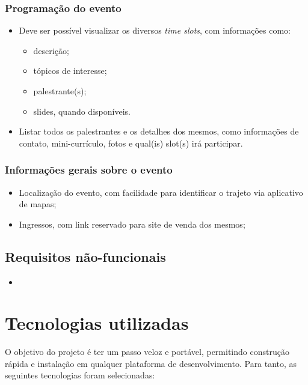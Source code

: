 \documentclass[12pt,a4paper,twoside,hyphens,english,brazil]{abntex2}
\begin{document}
\subsubsection*{Programação do evento}
\begin{itemize}
	\item Deve ser possível visualizar os diversos \emph{time slots}, com informações como:
		\begin{itemize}
			\item descrição;
			\item tópicos de interesse;
			\item palestrante(s);
			\item slides, quando disponíveis.
		\end{itemize}
	\item Listar todos os palestrantes e os detalhes dos mesmos, como informações de contato, mini-currículo, fotos e qual(is) slot(s) irá participar.
\end{itemize}

\subsubsection*{Informações gerais sobre o evento}
\begin{itemize}
	\item Localização do evento, com facilidade para identificar o trajeto via aplicativo de mapas;
	\item Ingressos, com link reservado para site de venda dos mesmos;
\end{itemize}

\subsection{Requisitos não-funcionais} %
\begin{itemize}
	\item 
\end{itemize}


\section{Tecnologias utilizadas} \label{sec:tecnologias}

O objetivo do projeto é ter um passo veloz e portável, permitindo construção rápida e instalação em qualquer plataforma de desenvolvimento. Para tanto, as seguintes tecnologias foram selecionadas:
\end{document}
